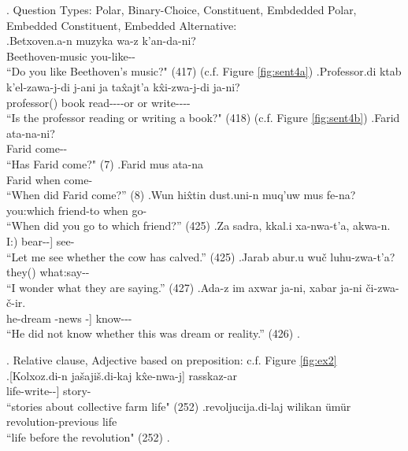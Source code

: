 \ex. \label{sent:ex4}Question Types: Polar, Binary-Choice, Constituent, Embdedded Polar, Embedded Constituent, Embedded Alternative:  \\
    \ag.\label{sent:ex4a}Betxoven.a-n muzyka wa-z k'an-da-ni? \\
    Beethoven-\Gen[] music you-\Dat[] like-\Fut[]-\Q[] \\
    ``Do you like Beethoven's music?" (417) (c.f. Figure \ref{fig:sent4a})
    \bg.\label{sent:ex4b}Professor.di ktab k'el-zawa-j-di j-ani ja ta\^{x}ajt'a k\^{x}i-zwa-j-di ja-ni? \\
    professor(\Erg[]) book read-\Impf[]-\Ptcp[]-\Sbstz[] \Cop[]-\Q[] or or write-\Impf[]-\Ptcp[]-\Sbstz[] \Cop[]-\Q[] \\
    ``Is the professor reading or writing a book?" (418) (c.f. Figure \ref{fig:sent4b})
    \bg.\label{sent:ex4c}Farid ata-na-ni? \\ 
    Farid come-\Aori-\Q \\
    ``Has Farid come?" (7)
    \bg.\label{sent:ex4d}Farid mus ata-na \\
    Farid when come-\Aori \\
    ``When did Farid come?'' (8)
    \bg.\label{sent:ex4e}Wun hi\^{x}tin dust.uni-n muq'uw mus fe-na? \\
    you:\Abs[] which friend-\Gen[] to when go-\Aori[] \\
    ``When did you go to which friend?'' (425)
    \bg.\label{sent:ex4f}Za sadra, kkal.i xa-nwa-t'a, akwa-n. \\
    I:\Erg[] \Pt[] [cow(\Erg[]) bear-\Prf[]-\Cond[]] see-\Hort[] \\
    ``Let me see whether the cow has calved.'' (425)
    \bg.\label{sent:ex4g}Jarab abur.u wu\v{c} luhu-zwa-t'a? \\
    \Pt[] they(\Erg[]) what:\Abs[] say-\Impf[]-\Cond[] \\
    ``I wonder what they are saying.'' (427)
    \bg.\label{sent:ex4h}Ada-z im axwar ja-ni, xabar ja-ni \v{c}i-zwa-\v{c}-ir. \\
    he-\Dat[] [this:\Abs[] dream \Cop[]-\Q[] news \Cop[]-\Q[]] know-\Impf[]-\Neg[]-\Pst[] \\
    ``He did not know whether this was dream or reality.'' (426)
    \z.


\ex. Relative clause, Adjective based on preposition: c.f. Figure \ref{fig:ex2} \\
    \ag.\label{sent:ex2a}[Kolxoz.di-n ja\v{s}aji\v{s}.di-kaj k\^{x}e-nwa-j] rasskaz-ar \\
        [kolkhoz-\Gen[] life-\Sbelc[] write-\Prf[]-\Ptcp[]] story-\Pl[] \\
        ``stories about collective farm life" (252)
    \bg.\label{sent:ex2b}revoljucija.di-laj wilikan \"{u}m\"{u}r \\
        revolution-\Srelc[] previous life \\
        ``life before the revolution" (252)
    \z.
    
